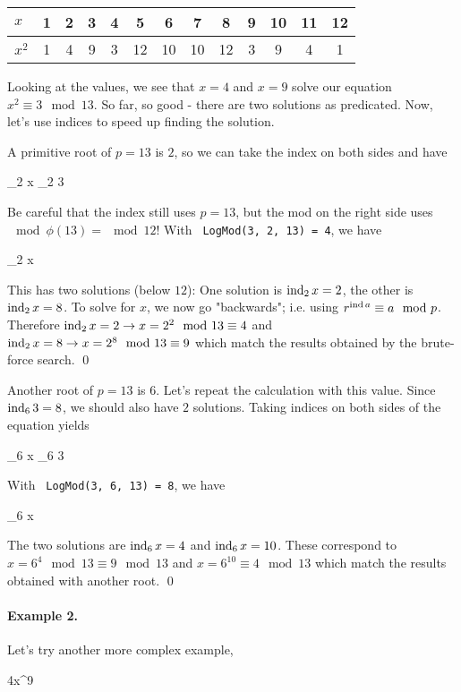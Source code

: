 \begin{tabular}{lcccccccccccc}
    $x$   & 1 & 2 & 3 & 4 & 5  & 6  & 7  & 8  & 9 & 10 & 11 & 12 \\ \hline
    $x^2$ & 1 & 4 & 9 & 3 & 12 & 10 & 10 & 12 & 3 & 9  & 4  & 1 
\end{tabular}

\vspace{2mm}

Looking at the values, we see that $x = 4$ and $x = 9$ solve our equation $x^2 \equiv 3 \mod 13$. So far, so good - there are two solutions as predicated. Now, let's use indices to speed up finding the solution.

A primitive root of $p=13$ is $2$, so we can take the index on both sides and have

 \ind_2 x \equiv \ind_2 3 
\eee

Be careful that the index still uses $p=13$, but the mod on the right side uses $\mod \phi(13) = \mod 12$! With \verb+ LogMod(3, 2, 13) = 4+, we have

 \ind_2 x  
\eee

This has two solutions (below $12$): One solution is $\operatorname{ind}_2 x = 2$, the other is $\operatorname{ind}_2 x = 8$. To solve for $x$, we now go "backwards"; i.e. using $r^{\operatorname{ind} a} \equiv a \mod p$. Therefore $\operatorname{ind}_2 x = 2 \rightarrow x = 2^2 \mod 13 \equiv 4$ and $\operatorname{ind}_2 x = 8 \rightarrow x = 2^8 \mod 13 \equiv 9$ which match the results obtained by the brute-force search. \qed

Another root of $p=13$ is $6$. Let's repeat the calculation with this value. Since $\operatorname{ind}_6 3 = 8$, we should also have $2$ solutions. Taking indices on both sides of the equation yields

 \ind_6 x \equiv \ind_6 3 
\eee

With \verb+ LogMod(3, 6, 13) = 8+, we have

 \ind_6 x  
\eee

The two solutions are $\operatorname{ind}_6 x = 4$ and $\operatorname{ind}_6 x = 10$. These correspond to $x = 6^4 \mod 13 \equiv 9 \mod 13$ and $x = 6^{10} \equiv 4 \mod 13$ which match the results obtained with another root. \qed


\paragraph{Example 2.} Let's try another more complex example,

\bee
4x^9  
\eee



